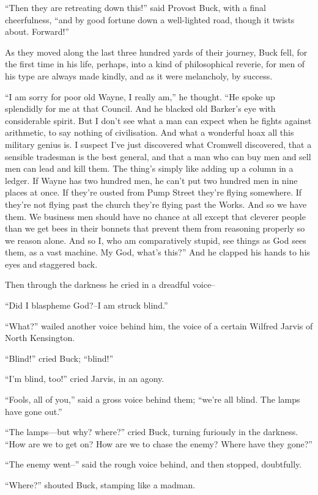 \documentclass{book}
\begin{document}
“Then they are retreating down this!” said Provost Buck, with a final cheerfulness, “and by good fortune down a well-lighted road, though it twists about. Forward!”

As they moved along the last three hundred yards of their journey, Buck fell, for the first time in his life, perhaps, into a kind of philosophical reverie, for men of his type are always made kindly, and as it were melancholy, by success.

“I am sorry for poor old Wayne, I really am,” he thought. “He spoke up splendidly for me at that Council. And he blacked old Barker’s eye with considerable spirit. But I don’t see what a man can expect when he fights against arithmetic, to say nothing of civilisation. And what a wonderful hoax all this military genius is. I suspect I’ve just discovered what Cromwell discovered, that a sensible tradesman is the best general, and that a man who can buy men and sell men can lead and kill them. The thing’s simply like adding up a column in a ledger. If Wayne has two hundred men, he can’t put two hundred men in nine places at once. If they’re ousted from Pump Street they’re flying somewhere. If they’re not flying past the church they’re flying past the Works. And so we have them. We business men should have no chance at all except that cleverer people than we get bees in their bonnets that prevent them from reasoning properly so we reason alone. And so I, who am comparatively stupid, see things as God sees them, as a vast machine. My God, what’s this?” And he clapped his hands to his eyes and staggered back.

Then through the darkness he cried in a dreadful voice–

“Did I blaspheme God?–I am struck blind.”

“What?” wailed another voice behind him, the voice of a certain Wilfred Jarvis of North Kensington.

“Blind!” cried Buck; “blind!”

“I’m blind, too!” cried Jarvis, in an agony.

“Fools, all of you,” said a gross voice behind them; “we’re all blind. The lamps have gone out.”

“The lamps—but why? where?” cried Buck, turning furiously in the darkness. “How are we to get on? How are we to chase the enemy? Where have they gone?”

“The enemy went–” said the rough voice behind, and then stopped, doubtfully.

“Where?” shouted Buck, stamping like a madman.
\end{document}
